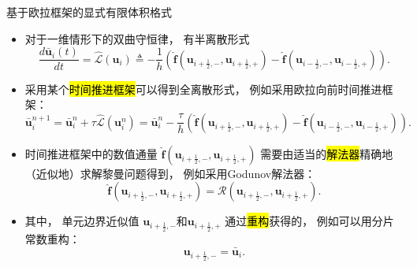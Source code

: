 \documentclass[aspectratio=169]{beamer}
\begin{document}
\begin{frame}{基于欧拉框架的显式有限体积格式}
  
  \begin{itemize}[<+->]
    \item 对于一维情形下的双曲守恒律，
          有半离散形式
          \begin{equation*}
            \label{eq:semi-uniform}
            \frac{d \bar{\bm{u}}_i(t)}{dt} = \hat{\mathcal{L}}({\bm{u}}_i) \triangleq -\frac{1}{h} \left(\hat{\bm{f}}({\bm{u}}_{i+\frac 12,-},{\bm{u}}_{i+\frac 12,+}) - \hat{\bm{f}}({\bm{u}}_{i-\frac 12,-},{\bm{u}}_{i-\frac 12,+})\right).
          \end{equation*}
          
    \item 采用某个\hl{时间推进框架}可以得到全离散形式，
          例如采用欧拉向前时间推进框架：
          \begin{equation*}
            \bar{\bm{u}}_i^{n+1}
            = \bar{\bm{u}}_i^{n} + \tau \hat{\mathcal{L}}({\bm{u}}_i^n)
            = \bar{\bm{u}}_i^{n} - \frac{\tau}{h} \left(\hat{\bm{f}}({\bm{u}}_{i+\frac 12,-},{\bm{u}}_{i+\frac 12,+}) - \hat{\bm{f}}({\bm{u}}_{i-\frac 12,-},{\bm{u}}_{i-\frac 12,+})\right).
          \end{equation*}
          
    \item 时间推进框架中的数值通量
          $\hat{\bm{f}}({\bm{u}}_{i+\frac 12,-},{\bm{u}}_{i+\frac 12,+})$
          需要由适当的\hl{解法器}精确地（近似地）求解黎曼问题得到，
          例如采用Godunov解法器：
          \begin{equation*}
            \hat{\bm{f}}({\bm{u}}_{i+\frac 12,-},{\bm{u}}_{i+\frac 12,+}) = \mathcal{R}({\bm u}_{i+\frac{1}{2},-},{\bm u}_{i+\frac{1}{2},+}).
          \end{equation*}
          
    \item 其中，
          单元边界近似值
          ${\bm{u}}_{i+\frac 12,-}$和${\bm{u}}_{i+\frac 12,+}$
          通过\hl{重构}获得的，
          例如可以用分片常数重构：
          \begin{equation*}
            {\bm{u}}_{i+\frac 12,-} = \bar {\bm u}_i.
          \end{equation*}
  \end{itemize}
  
\end{frame}
\end{document}

